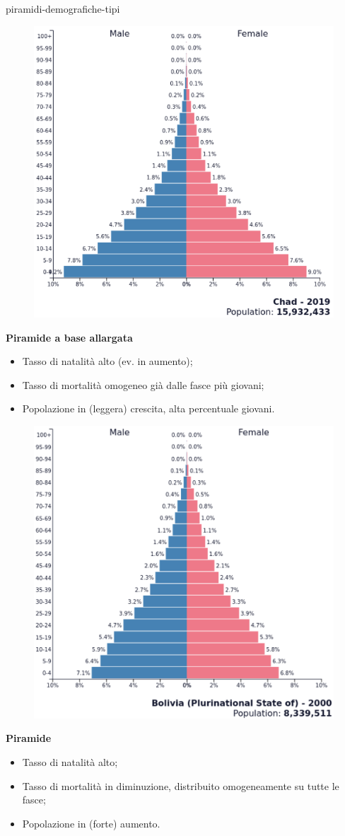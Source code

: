 \documentclass[preview]{standalone}
\begin{document}
\begin{snippet}{piramidi-demografiche-tipi}
    \setlength{\intextsep}{0pt}%
    \begin{figure}
        \includegraphics[width=.35\textwidth]{resources/piramide-demografica-base-allargata.png}
        \vspace{-0.5cm}
    \end{figure}
    \textbf{Piramide a base allargata}

    \begin{itemize}
        \item Tasso di natalità alto (ev. in aumento);
        \item Tasso di mortalità omogeneo già dalle fasce più giovani;
        \item Popolazione in (leggera) crescita, alta percentuale giovani.
    \end{itemize}
    \wrapfill

    \setlength{\intextsep}{0pt}%
    \begin{figure}
        \includegraphics[width=.35\textwidth]{resources/piramide-demografica.png}
        \vspace{-0.5cm}
    \end{figure}
    \textbf{Piramide}

    \begin{itemize}
        \item Tasso di natalità alto;
        \item Tasso di mortalità in diminuzione, distribuito omogeneamente su tutte le fasce;
        \item Popolazione in (forte) aumento.
    \end{itemize}
    \wrapfill


\end{snippet}
\end{document}
